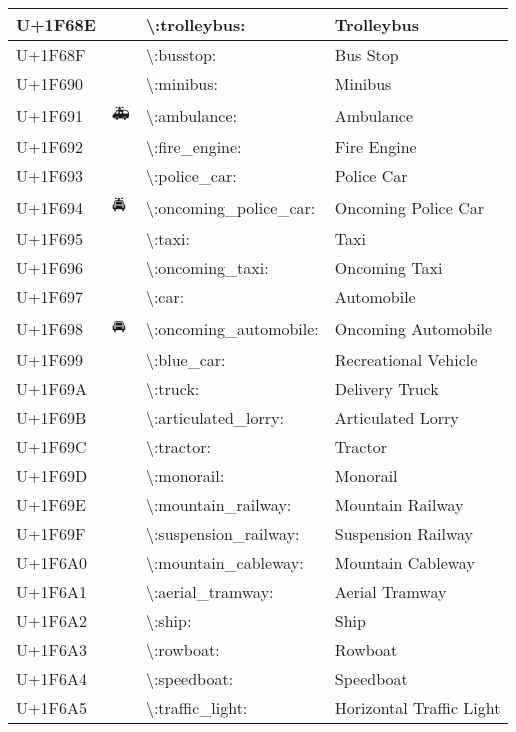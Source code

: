 \begin{table}[h]
\begin{tabulary}{\linewidth}{|L|L|L|L|}
\hline
U+1F68E & 🚎 & {\textbackslash}:trolleybus: & Trolleybus \\
\hline
U+1F68F & 🚏 & {\textbackslash}:busstop: & Bus Stop \\
\hline
U+1F690 & 🚐 & {\textbackslash}:minibus: & Minibus \\
\hline
U+1F691 & 🚑 & {\textbackslash}:ambulance: & Ambulance \\
\hline
U+1F692 & 🚒 & {\textbackslash}:fire\_engine: & Fire Engine \\
\hline
U+1F693 & 🚓 & {\textbackslash}:police\_car: & Police Car \\
\hline
U+1F694 & 🚔 & {\textbackslash}:oncoming\_police\_car: & Oncoming Police Car \\
\hline
U+1F695 & 🚕 & {\textbackslash}:taxi: & Taxi \\
\hline
U+1F696 & 🚖 & {\textbackslash}:oncoming\_taxi: & Oncoming Taxi \\
\hline
U+1F697 & 🚗 & {\textbackslash}:car: & Automobile \\
\hline
U+1F698 & 🚘 & {\textbackslash}:oncoming\_automobile: & Oncoming Automobile \\
\hline
U+1F699 & 🚙 & {\textbackslash}:blue\_car: & Recreational Vehicle \\
\hline
U+1F69A & 🚚 & {\textbackslash}:truck: & Delivery Truck \\
\hline
U+1F69B & 🚛 & {\textbackslash}:articulated\_lorry: & Articulated Lorry \\
\hline
U+1F69C & 🚜 & {\textbackslash}:tractor: & Tractor \\
\hline
U+1F69D & 🚝 & {\textbackslash}:monorail: & Monorail \\
\hline
U+1F69E & 🚞 & {\textbackslash}:mountain\_railway: & Mountain Railway \\
\hline
U+1F69F & 🚟 & {\textbackslash}:suspension\_railway: & Suspension Railway \\
\hline
U+1F6A0 & 🚠 & {\textbackslash}:mountain\_cableway: & Mountain Cableway \\
\hline
U+1F6A1 & 🚡 & {\textbackslash}:aerial\_tramway: & Aerial Tramway \\
\hline
U+1F6A2 & 🚢 & {\textbackslash}:ship: & Ship \\
\hline
U+1F6A3 & 🚣 & {\textbackslash}:rowboat: & Rowboat \\
\hline
U+1F6A4 & 🚤 & {\textbackslash}:speedboat: & Speedboat \\
\hline
U+1F6A5 & 🚥 & {\textbackslash}:traffic\_light: & Horizontal Traffic Light \\

\end{tabulary}
\end{table}
